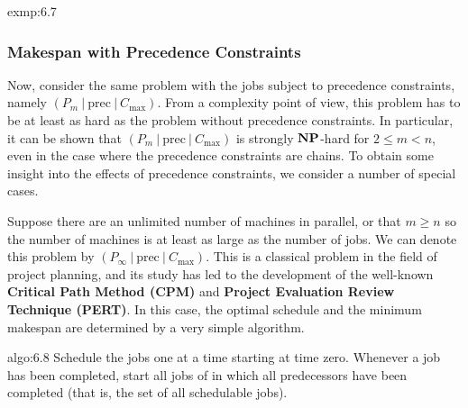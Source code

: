 \begin{exmp}{exmp:6.7}
\begin{center}
    \end{center}
    \vspace{-0.4cm}
\end{exmp}

\subsubsection{Makespan with Precedence Constraints} \label{subsubsec:6.1.2}
Now, consider the same problem with the jobs subject to precedence constraints,
namely $(P_m~|~\text{prec}~|~C_{\max})$. From a complexity point of view, this 
problem has to be at least as hard as the problem without precedence constraints.
In particular, it can be shown that $(P_m~|~\text{prec}~|~C_{\max})$ is 
strongly $\operatorname{\textbf{NP}}$-hard for $2 \leq m < n$, even in the case where the precedence 
constraints are chains. To obtain some insight into the effects of precedence 
constraints, we consider a number of special cases. 

Suppose there are an unlimited number of machines in parallel, or that 
$m \geq n$ so the number of machines is at least as large as the number of jobs.
We can denote this problem by $(P_\infty~|~\text{prec}~|~C_{\max})$. This 
is a classical problem in the field of project planning, and its study 
has led to the development of the well-known {\bf Critical Path Method 
(CPM)} and {\bf Project Evaluation Review Technique (PERT)}. In this case, 
the optimal schedule and the minimum makespan are determined by a very simple 
algorithm. 

\begin{algo}{algo:6.8}
    Schedule the jobs one at a time starting at time zero. Whenever a job has 
    been completed, start all jobs of in which all predecessors have been 
    completed (that is, the set of all schedulable jobs).
\end{algo}

